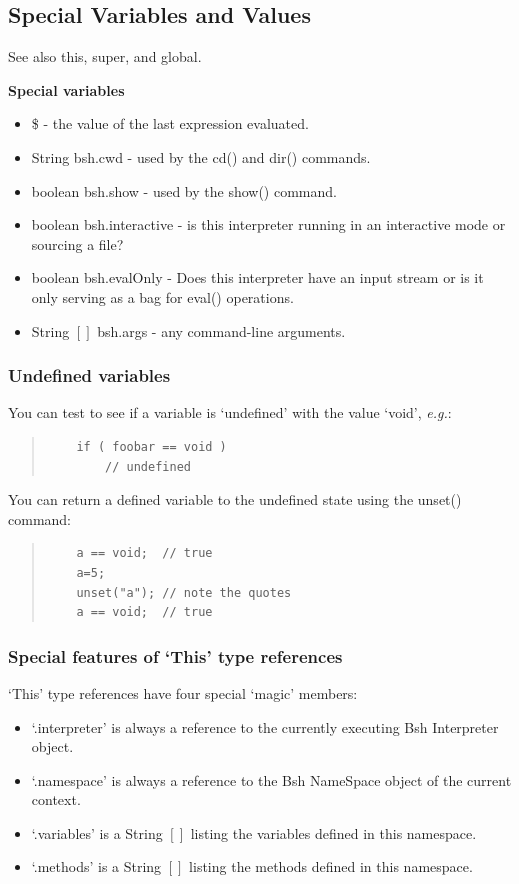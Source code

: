 \documentclass[twoside,11pt]{article}
\renewcommand{\_}{\texttt{\symbol{95}}}
\newcommand{\eg}{\textit{e.g.}}
\begin{document}
\subsection{Special Variables and Values}

See also this, super, and global.

\textbf{Special variables}
\begin{itemize}
 \item \$\_  - the value of the last expression evaluated.
 \item String bsh.cwd - used by the cd() and dir() commands.
 \item boolean bsh.show - used by the show() command.
 \item boolean bsh.interactive - is this interpreter running in an
 interactive mode or sourcing a file?
 \item boolean bsh.evalOnly - Does this interpreter have an input
 stream or is it only serving as a bag  for eval() operations.
 \item String $[]$ bsh.args - any command-line arguments.
\end{itemize}

\subsubsection{Undefined variables}
You can test to see if a variable is `undefined' with the value `void', \eg:
\begin{quote}
\begin{verbatim}
    if ( foobar == void )
        // undefined
\end{verbatim}
\end{quote}
You can return a defined variable to the undefined state using the unset()
command:
\begin{quote}
\begin{verbatim}
    a == void;  // true
    a=5;
    unset("a"); // note the quotes
    a == void;  // true
\end{verbatim}
\end{quote}

\subsubsection{Special features of `This' type references}
`This' type references have four special `magic' members:
\begin{itemize}
\item `.interpreter' is always a reference to the currently executing Bsh
      Interpreter object.
\item `.namespace' is always a reference to the Bsh NameSpace object  of the
      current context.
\item `.variables' is a String $[]$ listing the variables defined in this
      namespace.
\item `.methods' is a String $[]$ listing the methods defined in this
      namespace.
\end{itemize}
\end{document}
